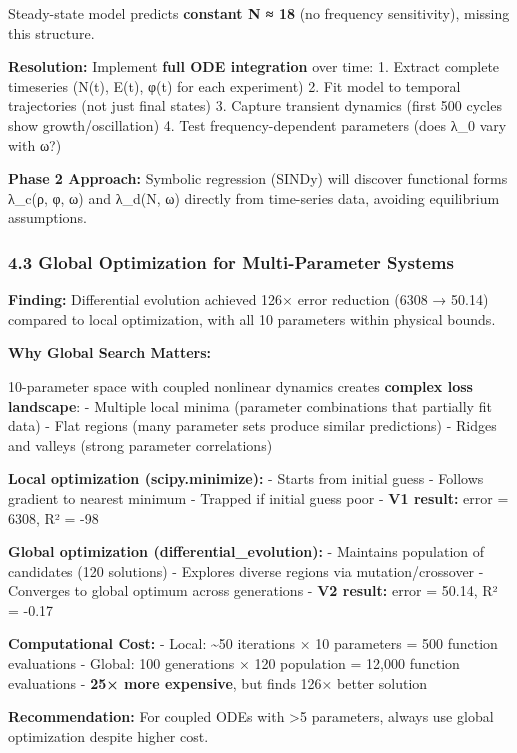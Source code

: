 \documentclass[
]{article}
\begin{document}
Steady-state model predicts \textbf{constant N ≈ 18} (no frequency
sensitivity), missing this structure.

\textbf{Resolution:} Implement \textbf{full ODE integration} over time:
1. Extract complete timeseries (N(t), E(t), φ(t) for each experiment) 2.
Fit model to temporal trajectories (not just final states) 3. Capture
transient dynamics (first 500 cycles show growth/oscillation) 4. Test
frequency-dependent parameters (does λ\_0 vary with ω?)

\textbf{Phase 2 Approach:} Symbolic regression (SINDy) will discover
functional forms λ\_c(ρ, φ, ω) and λ\_d(N, ω) directly from time-series
data, avoiding equilibrium assumptions.

\subsubsection{4.3 Global Optimization for Multi-Parameter
Systems}\label{global-optimization-for-multi-parameter-systems}

\textbf{Finding:} Differential evolution achieved 126× error reduction
(6308 → 50.14) compared to local optimization, with all 10 parameters
within physical bounds.

\textbf{Why Global Search Matters:}

10-parameter space with coupled nonlinear dynamics creates
\textbf{complex loss landscape}: - Multiple local minima (parameter
combinations that partially fit data) - Flat regions (many parameter
sets produce similar predictions) - Ridges and valleys (strong parameter
correlations)

\textbf{Local optimization (scipy.minimize):} - Starts from initial
guess - Follows gradient to nearest minimum - Trapped if initial guess
poor - \textbf{V1 result:} error = 6308, R² = -98

\textbf{Global optimization (differential\_evolution):} - Maintains
population of candidates (120 solutions) - Explores diverse regions via
mutation/crossover - Converges to global optimum across generations -
\textbf{V2 result:} error = 50.14, R² = -0.17

\textbf{Computational Cost:} - Local: \textasciitilde50 iterations × 10
parameters = 500 function evaluations - Global: 100 generations × 120
population = 12,000 function evaluations - \textbf{25× more expensive},
but finds 126× better solution

\textbf{Recommendation:} For coupled ODEs with \textgreater5 parameters,
always use global optimization despite higher cost.
\end{document}
